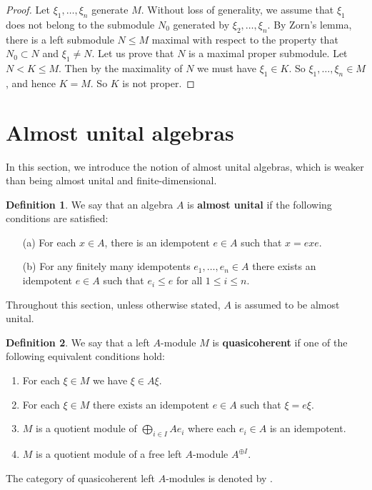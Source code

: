 \documentclass[11pt,b5paper,notitlepage]{article}
\theoremstyle{definition}
\newtheorem{df}{Definition}[section]
\theoremstyle{plain}
\newcommand{\QC}{\mathrm{QCoh}_{\mathrm L}}
\newcommand{\Coh}{\mathrm{Coh}_{\mathrm L}}
\numberwithin{equation}{section}
\begin{document}

\begin{proof}
Let $\xi_1,\dots,\xi_n$ generate $M$. Without loss of generality, we assume that $\xi_1$ does not belong to the submodule $N_0$ generated by $\xi_2,\dots,\xi_n$. By Zorn's lemma, there is a left submodule $N\leq M$ maximal with respect to the property that $N_0\subset N$ and $\xi_1\neq N$. Let us prove that $N$ is a maximal proper submodule. Let $N<K\leq M$. Then by the maximality of $N$ we must have $\xi_1\in K$. So $\xi_1,\dots,\xi_n\in M$, and hence $K=M$. So $K$ is not proper.
\end{proof}








\section{Almost unital algebras}


In this section, we introduce the notion of almost unital algebras, which is weaker than being almost unital and finite-dimensional.


\begin{df}
We say that an algebra $A$ is \textbf{almost unital} if the following conditions are satisfied:
\begin{itemize}
\item[(a)] For each $x\in A$, there is an idempotent $e\in A$ such that $x=exe$.
\item[(b)] For any finitely many idempotents $e_1,\dots,e_n\in A$ there exists an idempotent $e\in A$ such that $e_i\leq e$ for all $1\leq i\leq n$.
\end{itemize}
\end{df}


Throughout this section, unless otherwise stated, $A$ is assumed to be almost unital.

\begin{df}\label{lb18}
We say that a left $A$-module $M$ is \textbf{quasicoherent} if one of the following equivalent conditions hold:
\begin{enumerate}[label=(\arabic*)]
\item For each $\xi\in M$ we have $\xi\in A\xi$.
\item For each $\xi\in M$ there exists an idempotent $e\in A$ such that $\xi=e\xi$.
\item $M$ is a quotient module of $\bigoplus_{i\in I}Ae_i$ where each $e_i\in A$ is an idempotent.
\item $M$ is a quotient module of a free left $A$-module $A^{\oplus I}$.
\end{enumerate}
The category of quasicoherent left $A$-modules is denoted by \pmb{$\QC(A)$}.
\end{df}
\end{document}
